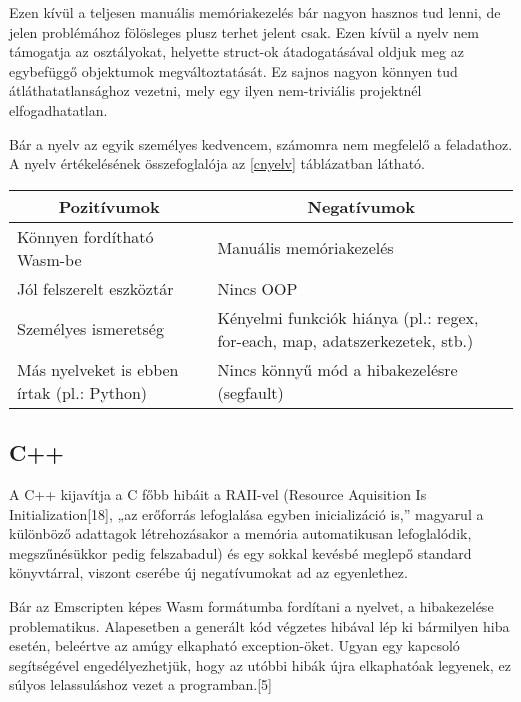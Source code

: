 Ezen kívül a teljesen manuális memóriakezelés bár nagyon hasznos tud lenni, de jelen problémához fölösleges plusz terhet jelent csak. Ezen kívül a nyelv nem támogatja az osztályokat, helyette struct-ok átadogatásával oldjuk meg az egybefüggő objektumok megváltoztatását. Ez sajnos nagyon könnyen tud átláthatatlansághoz vezetni, mely egy ilyen nem-triviális projektnél elfogadhatatlan.

Bár a nyelv az egyik személyes kedvencem, számomra nem megfelelő a feladathoz. A nyelv értékelésének összefoglalója az \ref{cnyelv} táblázatban látható.

\begin{center}
  \begin{tabularx}{\textwidth}{X X}
    \hline
    \multicolumn{1}{c}{\bfseries{Pozitívumok}} & \multicolumn{1}{c}{\bfseries{Negatívumok}} \\
    \hline
    Könnyen fordítható Wasm-be & Manuális memóriakezelés \\
    Jól felszerelt eszköztár & Nincs OOP \\
    Személyes ismeretség & Kényelmi funkciók hiánya (pl.: regex, for-each, map, adatszerkezetek, stb.) \\
    Más nyelveket is ebben írtak (pl.: Python) & Nincs könnyű mód a hibakezelésre (segfault) \\
    \hline
  \end{tabularx}
\end{center}

\newpage

\subsection{C++}

A C++ kijavítja a C főbb hibáit a RAII-vel (Resource Aquisition Is Initialization[18], „az erőforrás lefoglalása egyben inicializáció is,” magyarul a különböző adattagok létrehozásakor a memória automatikusan lefoglalódik, megszűnésükkor pedig felszabadul) és egy sokkal kevésbé meglepő standard könyvtárral, viszont cserébe új negatívumokat ad az egyenlethez. 

Bár az Emscripten képes Wasm formátumba fordítani a nyelvet, a hibakezelése problematikus. Alapesetben a generált kód végzetes hibával lép ki bármilyen hiba esetén, beleértve az amúgy elkapható exception-öket. Ugyan egy kapcsoló segítségével engedélyezhetjük, hogy az utóbbi hibák újra elkaphatóak legyenek, ez súlyos lelassuláshoz vezet a programban.[5]

